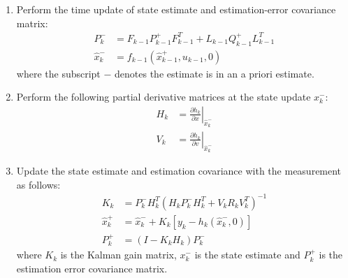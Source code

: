 \begin{enumerate}
    \item Perform the time update of state estimate and estimation-error covariance matrix:
        \begin{equation}
        \begin{aligned}
            P_{k}^{-} & =F_{k-1} P_{k-1}^{+} F_{k-1}^{T}+L_{k-1} Q_{k-1}^{+} L_{k-1}^{T} \\
            \hat{x}_{k}^{-} & =f_{k-1}\left(\hat{x}_{k-1}^{+}, u_{k-1}, 0\right)
        \end{aligned}
        \end{equation}
    where the subscript $-$ denotes the estimate is in an a priori estimate.
    
    \item Perform the following partial derivative matrices at the state update ${x}_{k}^{-}$:
        \begin{equation}
        \begin{aligned}
        H_{k} & =\left.\frac{\partial h_{k}}{\partial x}\right|_{\hat{x}_{k}^{-}} \\
        V_{k} & =\left.\frac{\partial h_{k}}{\partial v}\right|_{\hat{x}_{k}^{-}}
        \end{aligned}
        \end{equation}

    \item Update the state estimate and estimation covariance with the measurement as follows:
        \begin{equation}
        \begin{aligned}
        K_{k} & =P_{k}^{-} H_{k}^{T}\left(H_{k} P_{k}^{-} H_{k}^{T}+V_{k} R_{k} V_{k}^{T}\right)^{-1} \\
        \hat{x}_{k}^{+} & =\hat{x}_{k}^{-}+K_{k}\left[y_{k}-h_{k}\left(\hat{x}_{k}^{-}, 0\right)\right] \\
        P_{k}^{+} & =\left(I-K_{k} H_{k}\right) P_{k}^{-}
        \end{aligned}
        \end{equation}
    where $K_k$ is the Kalman gain matrix, ${x}_{k}^{-}$ is the state estimate and $P_{k}^{+}$ is the estimation error covariance matrix.
        
\end{enumerate}













